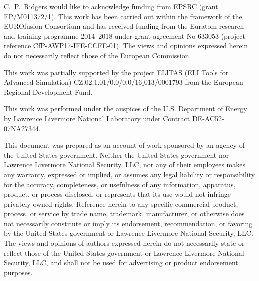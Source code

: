 






\begin{acknowledgments}
C.~P.~Ridgers would like to acknowledge funding from EPSRC (grant EP/M011372/1). This work has been carried out within the framework of the EUROfusion Consortium and has received funding from the Euratom research and training programme 2014–2018 under grant agreement No 633053 (project reference CfP-AWP17-IFE-CCFE-01). The views and opinions expressed herein do not necessarily reflect those of the European Commission.

This work was partially supported by the project ELITAS (ELI Tools for Advanced Simulation) CZ.02.1.01/0.0/0.0/16$\_$013/0001793 from the European Regional Development Fund.

This work was performed under the auspices of the U.S. Department of Energy by Lawrence Livermore National Laboratory under Contract DE-AC52-07NA27344.

This document was prepared as an account of work sponsored by an agency of the United States government. Neither the United States government nor Lawrence Livermore National Security, LLC, nor any of their employees makes any warranty, expressed or implied, or assumes any legal liability or responsibility for the accuracy, completeness, or usefulness of any information, apparatus, product, or process disclosed, or represents that its use would not infringe privately owned rights. Reference herein to any specific commercial product, process, or service by trade name, trademark, manufacturer, or otherwise does not necessarily constitute or imply its endorsement, recommendation, or favoring by the United States government or Lawrence Livermore National Security, LLC. The views and opinions of authors expressed herein do not necessarily state or reflect those of the United States government or Lawrence Livermore National Security, LLC, and shall not be used for advertising or product endorsement purposes.
\end{acknowledgments}

\appendix






